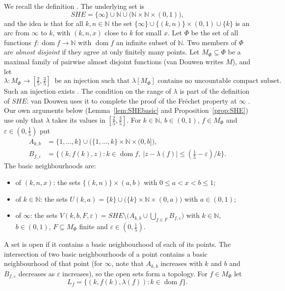 \documentclass[11pt]{amsart}
\theoremstyle{definition}
\theoremstyle{remark}
\newcommand{\N}{\mathbb{N}}
\newcommand{\dom}{\operatorname{dom}}
\newcommand{\SHE}{\mathit{SHE}}
\numberwithin{equation}{section}
\begin{document}
We recall the definition \cite[Sections~4 and 8]{vandouwen81}. The underlying set is
\[\SHE=\{\infty\}\cup\N\cup\bigl(\N\times\N\times(0,1)\bigr),\]
and the idea is that for all $k,n\in\N$ the set $\{\infty\}\cup\{(k,n)\}\times(0,1)\cup\{k\}$ is an arc from $\infty$ to $k$, with $(k,n,x)$ close to $k$ for small $x$. Let $\Phi$ be the set of all functions $f\colon\dom f\to\N$ with $\dom f$ an infinite subset of $\N$. Two members of $\Phi$ are \emph{almost disjoint} if they agree at only finitely many points. Let $M_\Phi\subseteq\Phi$ be a maximal family of pairwise almost disjoint functions (van Douwen writes $M$), and let
\[\lambda\colon M_\Phi\to[\tfrac25,\tfrac35]\ \text{ be an injection such that }\lambda[M_\Phi]\text{ contains no uncountable compact subset.}\]
Such an injection exists \cite[p.~435]{vandouwen81}. The condition on the range of $\lambda$ is part of the definition of $\SHE$: van Douwen uses it to complete the proof of the Fr\'echet property at $\infty$ \cite[p.~435]{vandouwen81}. Our own arguments below (Lemma~\ref{lem:SHEbasic} and Proposition~\ref{prop:SHE}) use only that $\lambda$ takes its values in $[\frac25,\frac35]$. For $k\in\N$, $b\in(0,1)$, $f\in M_\Phi$ and $\varepsilon\in(0,\frac15)$ put
\begin{align*}
A_{k,b}&=\{1,\dots,k\}\cup\bigl(\{1,\dots,k\}\times\N\times(0,b]\bigr),\\
B_{f,\varepsilon}&=\bigl\{(k,f(k),z):k\in\dom f,\ |z-\lambda(f)|\le(\tfrac15-\varepsilon)/k\bigr\}.
\end{align*}
The basic neighbourhoods are:
\begin{itemize}[leftmargin=2em]
\item of $(k,n,x)$: the sets $\{(k,n)\}\times(a,b)$ with $0\le a<x<b\le1$;
\item of $k\in\N$: the sets $U(k,a)=\{k\}\cup\bigl(\{k\}\times\N\times(0,a)\bigr)$ with $a\in(0,1)$;
\item of $\infty$: the sets $V(k,b,F,\varepsilon)=\SHE\setminus\bigl(A_{k,b}\cup\bigcup_{f\in F}B_{f,\varepsilon}\bigr)$ with $k\in\N$, $b\in(0,1)$, $F\subseteq M_\Phi$ finite and $\varepsilon\in(0,\frac15)$.
\end{itemize}
A set is open if it contains a basic neighbourhood of each of its points. The intersection of two basic neighbourhoods of a point contains a basic neighbourhood of that point (for $\infty$, note that $A_{k,b}$ increases with $k$ and $b$ and $B_{f,\varepsilon}$ decreases as $\varepsilon$ increases), so the open sets form a topology. For $f\in M_\Phi$ let
\[L_f=\{(k,f(k),\lambda(f)):k\in\dom f\}.\]
\end{document}

